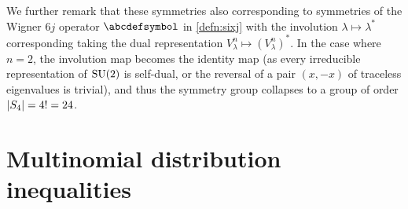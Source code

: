 \documentclass[notitlepage, 10pt]{article}
\begin{document}

We further remark that these symmetries also corresponding to symmetries of the Wigner $6j$ operator $\abcdefsymbol$ in \cref{defn:sixj} with the involution $\lambda \mapsto \lambda^{*}$ corresponding taking the dual representation $V_{\lambda}^{n} \mapsto (V_{\lambda}^{n})^{*}$.
In the case where $n = 2$, the involution map becomes the identity map (as every irreducible representation of $\operatorname{SU}(2)$ is self-dual, or the reversal of a pair $(x,-x)$ of traceless eigenvalues is trivial), and thus the symmetry group collapses to a group of order $\left|S_4\right| = 4! = 24$.

\section{Multinomial distribution inequalities}
\end{document}
